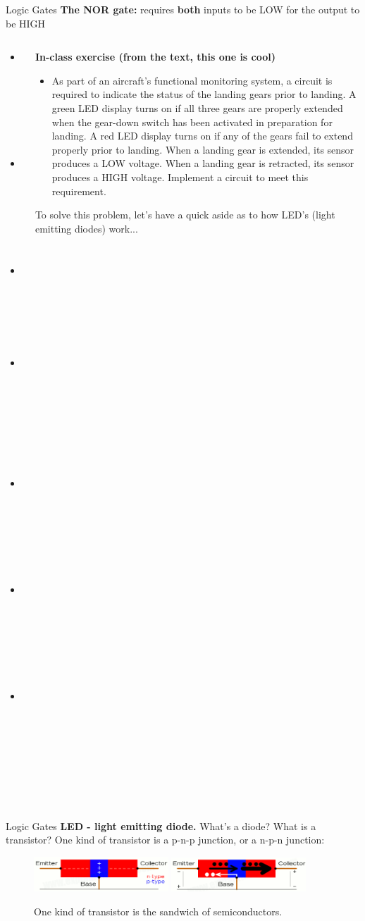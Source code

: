 \documentclass{beamer}
\begin{document}
\begin{frame}{Logic Gates}
\textbf{The NOR gate:} requires \textbf{both} inputs to be LOW for the output to be HIGH \\ \vspace{0.5cm}
\begin{columns}[T]
\begin{column}{0.5\textwidth}
\begin{itemize}
\item \alert{NOT, $n=1$, $m=1$}
\item \alert{AND, $n$, $m=1$}
\item \alert{OR, $n$, $m=1$}
\item \alert{NAND, $n$, $m=1$}
\item \alert{NOR, $n=2$, $m=1$}
\item XOR, $n=2$, $m=1$
\item XNOR, $n=2$, $m=1$
\end{itemize}
\end{column}
\begin{column}{0.5\textwidth}
\tiny
\textbf{In-class exercise (from the text, this one is cool)}
\begin{itemize}
\item As part of an aircraft's functional monitoring system, a circuit is required to indicate the status of the landing gears prior to landing.  A green LED display turns on if all three gears are properly extended when the gear-down switch has been activated in preparation for landing.  A red LED display turns on if any of the gears fail to extend properly prior to landing.  When a landing gear is extended, its sensor produces a LOW voltage.  When a landing gear is retracted, its sensor produces a HIGH voltage.  Implement a circuit to meet this requirement.
\end{itemize}
\alert{To solve this problem, let's have a quick aside as to how LED's (light emitting diodes) work...}
\end{column}
\end{columns}
\end{frame}

\begin{frame}{Logic Gates}
\textbf{LED - light emitting diode.}  What's a diode?  What is a transistor?  One kind of transistor is a p-n-p junction, or a n-p-n junction:
\begin{figure}
\centering
\includegraphics[width=0.45\textwidth]{figures/transistor2.png}
\includegraphics[width=0.45\textwidth]{figures/transistor3.png}
\caption{\label{fig:trans1} One kind of transistor is the sandwich of semiconductors.}
\end{figure}
\end{frame}
\end{document}
